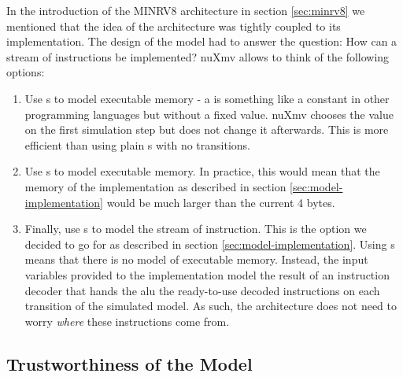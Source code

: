 In the introduction of the MINRV8 architecture in section \ref{sec:minrv8} we mentioned that the idea of the architecture was tightly coupled to its implementation.
The design of the model had to answer the question: How can a stream of instructions be implemented?
nuXmv allows to think of the following options:
\begin{enumerate}
    \item \label{itm:exmem-frozen}
    Use s to model executable memory - a  is something like a constant in other programming languages but without a fixed value.
    nuXmv chooses the value on the first simulation step but does not change it afterwards.
    This is more efficient than using plain s with no transitions.
    \item \label{itm:exmem-var}
    Use s to model executable memory.
    In practice, this would mean that the memory of the implementation as described in section \ref{sec:model-implementation} would be much larger than the current 4 bytes.
    \item \label{itm:exmem-ivar}
    Finally, use s to model the stream of instruction.
    This is the option we decided to go for as described in section \ref{sec:model-implementation}.
    Using s means that there is no model of executable memory.
    Instead, the input variables provided to the implementation model the result of an instruction decoder that hands the \gls{alu} the ready-to-use decoded instructions on each transition of the simulated model.
    As such, the architecture does not need to worry \textit{where} these instructions come from.
\end{enumerate}

\subsection{Trustworthiness of the Model}
